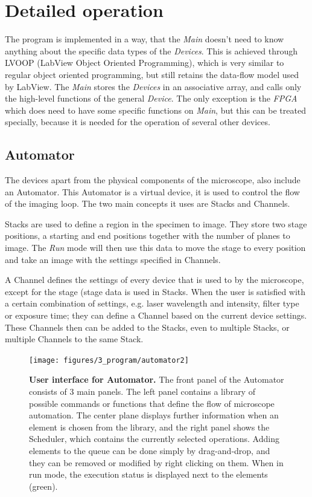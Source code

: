 \documentclass{diploma_style}
\begin{document}
\section{Detailed operation}
The program is implemented in a way, that the \emph{Main} doesn't need to know anything about the specific data types of the \emph{Devices}. This is achieved through LVOOP (LabView Object Oriented Programming), which is very similar to regular object oriented programming, but still retains the data-flow model used by LabView. The \emph{Main} stores the \emph{Devices} in an associative array, and calls only the high-level functions of the general \emph{Device}. The only exception is the \emph{FPGA} which does need to have some specific functions on \emph{Main}, but this can be treated specially, because it is needed for the operation of several other devices. 

\subsection{Automator}
\label{automator}
The devices apart from the physical components of the microscope, also include an Automator. This Automator is a virtual device, it is used to control the flow of the imaging loop. The two main concepts it uses are Stacks and Channels.

Stacks are used to define a region in the specimen to image. They store two stage positions, a starting and end positions together with the number of planes to image. The \emph{Run} mode will then use this data to move the stage to every position and take an image with the settings specified in Channels.

A Channel defines the settings of every device that is used to by the microscope, except for the stage (stage data is used in Stacks. When the user is satisfied with a certain combination of settings, e.g. laser wavelength and intensity, filter type or exposure time; they can define a Channel based on the current device settings. These Channels then can be added to the Stacks, even to multiple Stacks, or multiple Channels to the same Stack.

\begin{figure}[htbp]
	\centering
	\texttt{[image: figures/3\_program/automator2]}
	\caption{\textbf{User interface for Automator.} The front panel of the Automator consists of 3 main panels. The left panel contains a library of possible commands or functions that define the flow of microscope automation. The center plane displays further information when an element is chosen from the library, and the right panel shows the Scheduler, which contains the currently selected operations. Adding elements to the queue can be done simply by drag-and-drop, and they can be removed or modified by right clicking on them. When in run mode, the execution status is displayed next to the elements (green).}
	\label{fig:ui_automator}
\end{figure}
\end{document}
